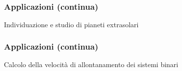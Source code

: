 \documentclass[10pt]{beamer}
\begin{document}
\begin{frame}
  \frametitle{Applicazioni (continua)}
  \begin{adv}
  \item Individuazione e studio di pianeti extrasolari
  \end{adv}
  \begin{center}
    \begin{tikzpicture}[scale=0.55,font=\scriptsize]
      
    \end{tikzpicture}
  \end{center}
\end{frame}

\begin{frame}
  \frametitle{Applicazioni (continua)}
  \begin{adv}
  \item Calcolo della velocità di allontanamento dei sistemi binari
  \end{adv}
  \begin{figure}
    \centering
    \begin{tikzpicture}[scale=0.9]
      
    \end{tikzpicture}
  \end{figure}
\end{frame}
\end{document}
